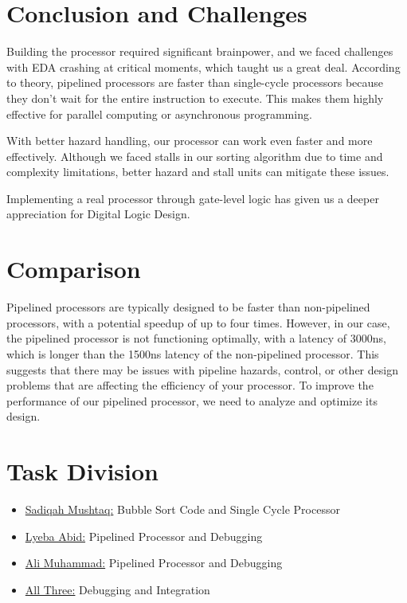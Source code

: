 \documentclass{report}
\theoremstyle{mytheoremstyle}
\theoremstyle{mytheoremstyle}
\theoremstyle{myproblemstyle}
\begin{document}
\chapter{Conclusion and Challenges}

Building the processor required significant brainpower, and we faced challenges with EDA crashing at critical moments, which taught us a great deal. According to theory, pipelined processors are faster than single-cycle processors because they don't wait for the entire instruction to execute. This makes them highly effective for parallel computing or asynchronous programming.

With better hazard handling, our processor can work even faster and more effectively. Although we faced stalls in our sorting algorithm due to time and complexity limitations, better hazard and stall units can mitigate these issues.

Implementing a real processor through gate-level logic has given us a deeper appreciation for Digital Logic Design.

\chapter{Comparison}

Pipelined processors are typically designed to be faster than non-pipelined processors, with a potential speedup of up to four times. However, in our case, the pipelined processor is not functioning optimally, with a latency of 3000ns, which is longer than the 1500ns latency of the non-pipelined processor. This suggests that there may be issues with pipeline hazards, control, or other design problems that are affecting the efficiency of your processor. To improve the performance of our pipelined processor, we need to analyze and optimize its design.

\chapter{Task Division}
\begin{itemize}
    \item {\large \underline{Sadiqah Mushtaq:} Bubble Sort Code and Single Cycle Processor}
    \item {\large \underline{Lyeba Abid:} Pipelined Processor and Debugging}
    \item {\large \underline{Ali Muhammad:} Pipelined Processor and Debugging}
    \item {\large \underline{All Three:} Debugging and Integration}
\end{itemize}
\end{document}
